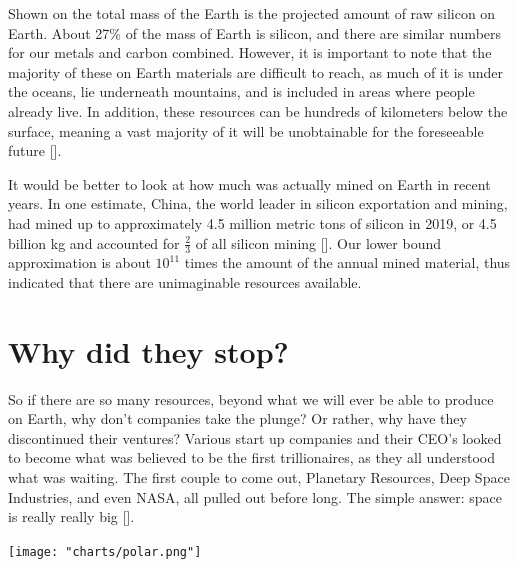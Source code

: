 \documentclass[12pt]{report}
\begin{document}
\;\;\;\; Shown on the total mass of the Earth is the projected amount of raw silicon on Earth. About 27\% of the mass of Earth is silicon, and there are similar numbers for our metals and carbon combined. However, it is important to note that the majority of these on Earth materials are difficult to reach, as much of it is under the oceans, lie underneath mountains, and is included in areas where people already live. In addition, these resources can be hundreds of kilometers below the surface, meaning a vast majority of it will be unobtainable for the foreseeable future [\cite{Sharp}]. 

\;\;\;\; It would be better to look at how much was actually mined on Earth in recent years. In one estimate, China, the world leader in silicon exportation and mining, had mined up to approximately 4.5 million metric tons of silicon in 2019, or 4.5 billion kg and accounted for $\frac{2}{3}$ of all silicon mining [\cite{Statista}]. Our lower bound approximation is about $10^{11}$ times the amount of the annual mined material, thus indicated that there are unimaginable resources available.
\section*{Why did they stop?}

\;\;\;\; So if there are so many resources, beyond what we will ever be able to produce on Earth, why don't companies take the plunge? Or rather, why have they discontinued their ventures? Various start up companies and their CEO's looked to become what was believed to be the first trillionaires, as they all understood what was waiting. The first couple to come out, Planetary Resources, Deep Space Industries, and even NASA, all pulled out before long. The simple answer: space is really really big [\cite{PhysWorld}]. 

\texttt{[image: "charts/polar.png"]}
\end{document}
